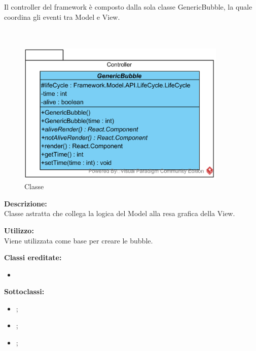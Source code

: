 \subsubsection[::Controller]{\class}\label{\class}
Il controller del framework è composto dalla sola classe GenericBubble, la quale coordina gli eventi tra Model e View.

\paragraph[::GenericBubble]{\class}\mbox{}\\ \label{\class}
\begin{figure}[H]
	\centering
	\includegraphics[width=10cm]{./diagrammi/framework/controller/genericbubble.png}
	\caption{Classe \class}
\end{figure}
\textbf{Descrizione:}\\
Classe astratta che collega la logica del Model alla resa grafica della View.

\textbf{Utilizzo:}\\
Viene utilizzata come base per creare le bubble.

\textbf{Classi ereditate:}
\begin{itemize}
	\item {}
\end{itemize}

\textbf{Sottoclassi:}
\begin{itemize}
	\item {};
	\item {};
	\item {};
\end{itemize}

